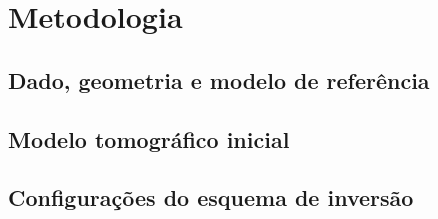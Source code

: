 \chapter{Metodologia}
\label{ch:metodologia}

\section{Dado, geometria e modelo de referência}

\section{Modelo tomográfico inicial}

\section{Configurações do esquema de inversão}



